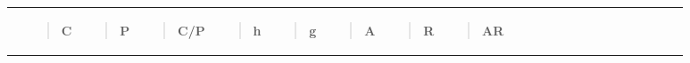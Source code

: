 \begin{longtable}[]{@{}clllllllllllllllllll@{}}
\toprule
\begin{minipage}[b]{0.05\columnwidth}\centering\strut
\strut
\end{minipage} & \begin{minipage}[b]{0.05\columnwidth}\raggedright\strut
\begin{quote}
\textbf{C}
\end{quote}\strut
\end{minipage} & \begin{minipage}[b]{0.05\columnwidth}\raggedright\strut
\begin{quote}
\textbf{P}
\end{quote}\strut
\end{minipage} & \begin{minipage}[b]{0.05\columnwidth}\raggedright\strut
\begin{quote}
\textbf{C/P}
\end{quote}\strut
\end{minipage} & \begin{minipage}[b]{0.05\columnwidth}\raggedright\strut
\begin{quote}
\textbf{h}
\end{quote}\strut
\end{minipage} & \begin{minipage}[b]{0.05\columnwidth}\raggedright\strut
\begin{quote}
\textbf{g}
\end{quote}\strut
\end{minipage} & \begin{minipage}[b]{0.05\columnwidth}\raggedright\strut
\begin{quote}
\textbf{A}
\end{quote}\strut
\end{minipage} & \begin{minipage}[b]{0.05\columnwidth}\raggedright\strut
\begin{quote}
\textbf{R}
\end{quote}\strut
\end{minipage} & \begin{minipage}[b]{0.05\columnwidth}\raggedright\strut
\begin{quote}
\textbf{AR}
\end{quote}\strut
\end{minipage} & \begin{minipage}[b]{0.05\columnwidth}\raggedright\strut
\begin{quote}

\end{quote}
\end{minipage}
\end{longtable}
